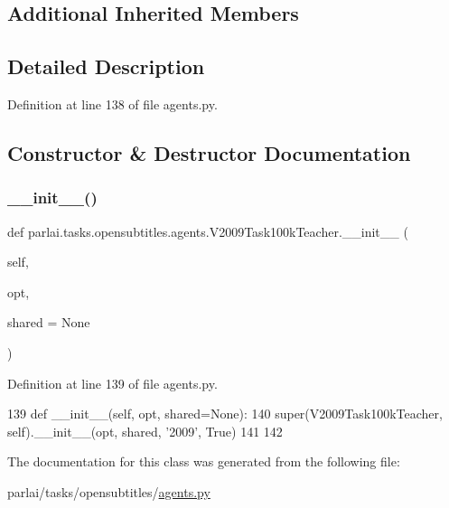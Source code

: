 \subsection*{Additional Inherited Members}


\subsection{Detailed Description}


Definition at line 138 of file agents.\+py.



\subsection{Constructor \& Destructor Documentation}
\mbox{\label{classparlai_1_1tasks_1_1opensubtitles_1_1agents_1_1V2009Task100kTeacher_a99fe8e12c849b677378eb7ed8c18f344}} 
\subsubsection{\texorpdfstring{\+\_\+\+\_\+init\+\_\+\+\_\+()}{\_\_init\_\_()}}
{\footnotesize\ttfamily def parlai.\+tasks.\+opensubtitles.\+agents.\+V2009\+Task100k\+Teacher.\+\_\+\+\_\+init\+\_\+\+\_\+ (\begin{DoxyParamCaption}\item[{}]{self,  }\item[{}]{opt,  }\item[{}]{shared = {\ttfamily None} }\end{DoxyParamCaption})}



Definition at line 139 of file agents.\+py.


\begin{DoxyCode}
139     \textcolor{keyword}{def }\_\_init\_\_(self, opt, shared=None):
140         super(V2009Task100kTeacher, self).\_\_init\_\_(opt, shared, \textcolor{stringliteral}{'2009'}, \textcolor{keyword}{True})
141 
142 
\end{DoxyCode}


The documentation for this class was generated from the following file\+:\begin{DoxyCompactItemize}
\item 
parlai/tasks/opensubtitles/\hyperlink{parlai_2tasks_2opensubtitles_2agents_8py}{agents.\+py}\end{DoxyCompactItemize}
